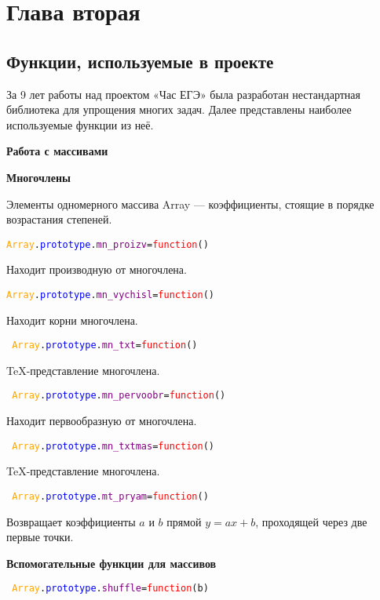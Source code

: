 \section{Глава вторая}
\subsection{Функции, используемые в проекте}
За 9 лет работы над проектом «Час ЕГЭ» была разработан нестандартная библиотека для упрощения многих задач. Далее представлены наиболее используемые функции из неё.

\textbf{Работа с массивами}

\textbf{Многочлены}

Элементы одномерного массива Array --- коэффициенты, стоящие в порядке возрастания степеней.

\texttt{\textcolor{Orange}{Array}.\textcolor{Blue}{prototype}.\textcolor{Purple}{mn\_proizv}=\textcolor{Red}{function}()}

Находит производную от многочлена.

\texttt{\textcolor{Orange}{Array}.\textcolor{Blue}{prototype}.\textcolor{Purple}{mn\_vychisl}=\textcolor{Red}{function}()
}

Находит корни многочлена.

\texttt{
	\textcolor{Orange}{Array}.\textcolor{Blue}{prototype}.\textcolor{Purple}{mn\_txt}=\textcolor{Red}{function}()}

TeX-представление многочлена.%

\texttt{
	\textcolor{Orange}{Array}.\textcolor{Blue}{prototype}.\textcolor{Purple}{mn\_pervoobr}=\textcolor{Red}{function}()
}

Находит первообразную от многочлена.%

\texttt{
	\textcolor{Orange}{Array}.\textcolor{Blue}{prototype}.\textcolor{Purple}{mn\_txtmas}=\textcolor{Red}{function}()
}

TeX-представление многочлена.

\texttt{
	\textcolor{Orange}{Array}.\textcolor{Blue}{prototype}.\textcolor{Purple}{mt\_pryam}=\textcolor{Red}{function}()
}

Возвращает коэффициенты $a$ и $b$ прямой $y=ax+b$, проходящей через две первые точки.

\textbf{Вспомогательные функции для массивов}

\texttt{
	\textcolor{Orange}{Array}.\textcolor{Blue}{prototype}.\textcolor{Purple}{shuffle}=\textcolor{Red}{function}(b)
}

